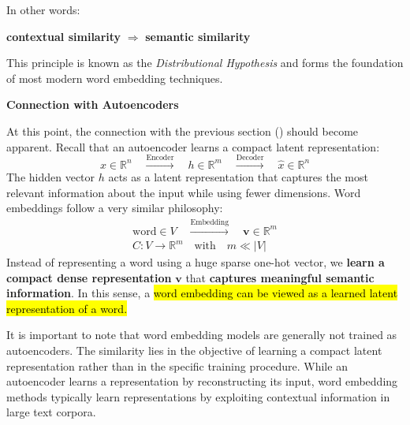 \highspace
In other words:
\begin{center}
    \textbf{contextual similarity} $\Longrightarrow$ \textbf{semantic similarity}
\end{center}
This principle is known as the \emph{Distributional Hypothesis} and forms the foundation of most modern word embedding techniques.

\newpage

\begin{flushleft}
    \textcolor{Green3}{ \textbf{Connection with Autoencoders}}
\end{flushleft}
At this point, the connection with the previous section () should become apparent. Recall that an autoencoder learns a compact latent representation:
\begin{equation*}
    x \in \mathbb{R}^{n} \quad \xrightarrow{\text{Encoder}} \quad h \in \mathbb{R}^{m} \quad \xrightarrow{\text{Decoder}} \quad \hat{x} \in \mathbb{R}^{n}
\end{equation*}
The hidden vector $h$ acts as a latent representation that captures the most relevant information about the input while using fewer dimensions. Word embeddings follow a very similar philosophy:
\begin{gather*}
    \text{word} \in V \quad \xrightarrow{\text{Embedding}} \quad \mathbf{v} \in \mathbb{R}^{m} \\
    C: V \rightarrow \mathbb{R}^{m} \quad \text{with} \quad m \ll \left|V\right|
\end{gather*}
Instead of representing a word using a huge sparse one-hot vector, we \textbf{learn a compact dense representation} $\mathbf{v}$ that \textbf{captures meaningful semantic information}. In this sense, a \hl{word embedding can be viewed as a learned latent representation of a word.}

\highspace
It is important to note that word embedding models are generally not trained as autoencoders. The similarity lies in the objective of learning a compact latent representation rather than in the specific training procedure. While an autoencoder learns a representation by reconstructing its input, word embedding methods typically learn representations by exploiting contextual information in large text corpora.